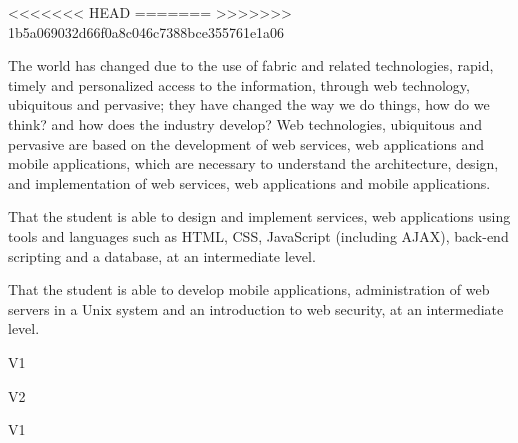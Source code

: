 \begin{syllabus}

<<<<<<< HEAD
=======
>>>>>>> 1b5a069032d66f0a8c046c7388bce355761e1a06

\begin{justification}
The world has changed due to the use of fabric and related technologies, rapid, timely and personalized access to the
information, through web technology, ubiquitous and pervasive; they have changed the way we do things, how do we think? and how does the industry develop?
Web technologies, ubiquitous and pervasive are based on the development of web services, web applications and mobile applications,
which are necessary to understand the architecture, design, and implementation of web services, web applications and mobile applications.
\end{justification}

\begin{goals}
    \item That the student is able to design and implement services, web applications using tools and languages such as HTML, CSS, JavaScript (including AJAX), back-end scripting and a database, at an intermediate level.
    \item That the student is able to develop mobile applications, administration of web servers in a Unix system and an introduction to web security, at an intermediate level.
\end{goals}

\begin{outcomes}{V1}
    \item {}
    \item {}
    \item {}
    \item {}
\end{outcomes}

\begin{outcomes}{V2}
    \item {}
    \item {}
    \item {}
    \item {}
\end{outcomes}

\begin{competences}{V1}
    \item {}
    \item {}
    \item {}
\end{competences}


\end{syllabus}
